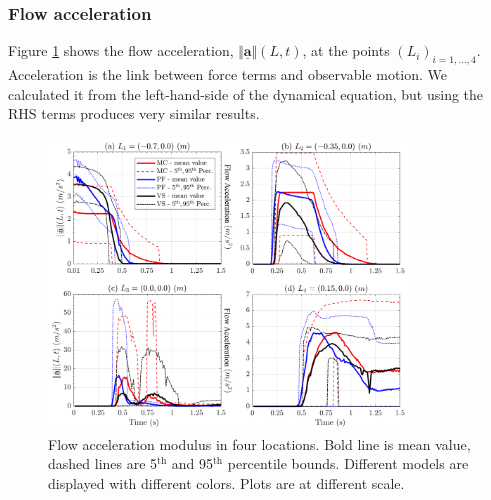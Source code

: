 \documentclass{article}
\begin{document}
\subsubsection{Flow acceleration}
Figure \ref{fig:Ramp-AccL} shows the flow acceleration, $\Vert \underline{\mathbf{a}} \Vert(L,t)$, at the points $(L_i)_{i=1,\dots,4}$. Acceleration is the link between force terms and observable motion. We calculated it from the left-hand-side of the dynamical equation, but using the RHS terms produces very similar results.
\begin{figure}[H]
         \centering
        \includegraphics[width=0.85\textwidth]{figures/incline/Acceleration.png}
        \caption{Flow acceleration modulus in four locations. Bold line is mean value, dashed lines are 5$^{\mathrm{th}}$ and 95$^{\mathrm{th}}$ percentile bounds. Different models are displayed with different colors. Plots are at different scale.}
        \label{fig:Ramp-AccL}
\end{figure}
\end{document}
